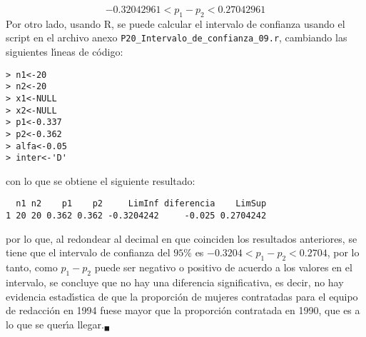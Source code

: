 \begin{solucion}
\begin{enumerate}
  \begin{equation*}
   -0.32042961 < p_1 - p_2 < 0.27042961
  \end{equation*}
  Por otro lado, usando R, se puede calcular el intervalo de confianza usando el script en el archivo anexo \texttt{P20\_Intervalo\_de\_confianza\_09.r}, cambiando las siguientes l\'{\i}neas de c\'odigo:
  \begin{verbatim}
> n1<-20
> n2<-20
> x1<-NULL
> x2<-NULL
> p1<-0.337
> p2<-0.362
> alfa<-0.05
> inter<-'D'
  \end{verbatim}
  \vspace{-0.5cm}
  con lo que se obtiene el siguiente resultado:
  \begin{verbatim}
  n1 n2    p1    p2     LimInf diferencia    LimSup
1 20 20 0.362 0.362 -0.3204242     -0.025 0.2704242
  \end{verbatim}
  \vspace{-0.5cm}
  por lo que, al redondear al decimal en que coinciden los resultados anteriores, se tiene que el intervalo de confianza del $95\%$ es $-0.3204 < p_1 - p_2 < 0.2704$, por lo tanto, como $p_1 - p_2$ puede ser negativo o positivo de acuerdo a los valores en el intervalo, se concluye que no hay una diferencia significativa, es decir, no hay evidencia estad\'{\i}stica de que la proporci\'on de mujeres contratadas para el equipo de redacci\'on en 1994 fuese mayor que la proporci\'on contratada en 1990, que es a lo que se quer\'{\i}a llegar.${}_{\blacksquare}$
 \end{enumerate}
\end{solucion}
